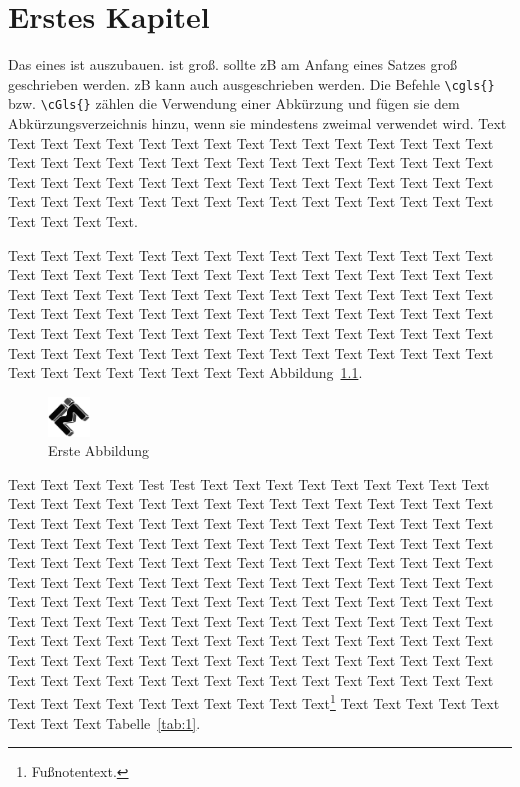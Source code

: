 \chapter{Erstes Kapitel}

Das  eines  ist auszubauen.  ist groß.  sollte \acrshort{zB} am Anfang eines Satzes groß geschrieben werden. \glqq \Acrlong{zB}\grqq\xspace kann auch ausgeschrieben werden. Die Befehle \verb|\cgls{}| bzw. \verb|\cGls{}| zählen die Verwendung einer Abkürzung und fügen sie dem Abkürzungsverzeichnis hinzu, wenn sie mindestens zweimal verwendet wird. Text Text Text Text Text Text Text Text Text Text Text Text Text Text Text Text Text Text Text Text Text Text Text Text Text Text Text Text Text Text Text Text Text Text Text Text Text Text Text Text Text Text Text Text Text Text Text Text Text Text  Text  Text  Text  Text Text Text Text Text Text Text Text Text Text Text Text.

Text  Text Text Text Text Text Text Text Text Text Text Text Text Text Text Text Text Text Text Text Text Text Text Text Text Text Text Text Text Text Text Text Text Text Text Text Text Text Text Text Text Text Text Text Text Text Text Text Text Text Text Text Text Text Text Text Text Text Text Text Text Text Text Text Text Text Text Text Text Text Text Text Text Text Text Text Text Text Text Text Text Text Text Text Text Text Text Text Text Text Text Text Text Text Text Text Text Text Abbildung~\ref{fig:1}.%

\begin{figure}[ht]
    \centering
    \includegraphics[width=0.1\textwidth]{./pictures/IM-Logo}
    \caption[Erste Abbildung]{Erste Abbildung\footnotemark}\label{fig:1}
\end{figure}

Text Text Text Text Test Test Text Text Text Text Text Text Text Text Text Text Text Text Text Text Text Text Text Text Text Text Text Text Text Text Text Text Text Text Text Text Text Text Text Text Text Text Text Text Text Text Text Text Text Text Text Text Text Text Text Text Text Text Text Text Text Text Text Text Text Text Text Text Text Text Text Text Text Text Text Text Text Text Text Text Text Text Text Text Text Text Text Text Text Text Text Text Text Text Text Text Text Text Text Text Text Text Text Text Text Text Text Text Text Text Text  Text Text Text Text Text Text Text Text Text Text Text Text Text Text Text Text Text Text Text Text Text Text Text Text Text Text Text Text Text Text Text Text Text Text Text Text Text Text Text Text Text Text Text Text Text Text Text Text Text Text Text Text Text Text Text Text Text Text Text Text Text Text Text Text\footnote{Fußnotentext.} Text Text Text Text Text Text Text Text Tabelle~\ref{tab:1}.%


